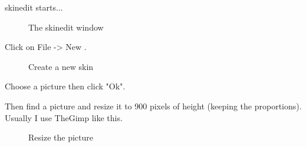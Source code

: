 \documentclass[10pt]{report}
\begin{document}
skinedit starts...\newline
\begin{figure}[H]
\centering
{}
\caption{The skinedit window}
\end{figure}
Click on File -> New .\newline

\begin{figure}[H]
\centering
{}
\caption{Create a new skin}
\end{figure}

Choose a picture then click "Ok".\newline

Then find a picture and resize it to 900 pixels of height (keeping the proportions).\newline
Usually I use TheGimp like this.\newline
\begin{figure}[H]
\centering
{}
\caption{Resize the picture}
\end{figure}
\end{document}
